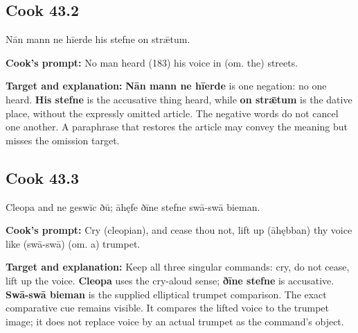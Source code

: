 \par\begin{minipage}{\linewidth}\raggedright
\subsection*{Cook 43.2}

Nān mann ne hīerde his stefne on strǣtum.

\textbf{Cook's prompt:} No man heard (183) his voice in (om. the) streets.

\textbf{Target and explanation:} \textbf{Nān mann ne hīerde} is one negation: no one heard. \textbf{His stefne} is the accusative thing heard, while \textbf{on strǣtum} is the dative place, without the expressly omitted article. The negative words do not cancel one another. A paraphrase that restores the article may convey the meaning but misses the omission target.

\end{minipage}\par\addvspace{4pt}

\par\begin{minipage}{\linewidth}\raggedright
\subsection*{Cook 43.3}

Cleopa and ne geswīc ðū; āhęfe ðīne stefne swā-swā bieman.

\textbf{Cook's prompt:} Cry (cleopian), and cease thou not, lift up (āhębban) thy voice like (swā-swā) (om. a) trumpet.

\textbf{Target and explanation:} Keep all three singular commands: cry, do not cease, lift up the voice. \textbf{Cleopa} uses the cry-aloud sense; \textbf{ðīne stefne} is accusative. \textbf{Swā-swā bieman} is the supplied elliptical trumpet comparison. The exact comparative cue remains visible. It compares the lifted voice to the trumpet image; it does not replace voice by an actual trumpet as the command's object.

\end{minipage}\par\addvspace{4pt}

